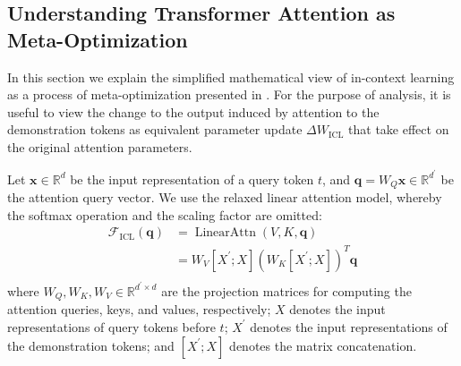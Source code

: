 \subsection{Understanding Transformer Attention as Meta-Optimization}
\label{sec:icl_dual}
In this section we explain the simplified mathematical view of in-context learning as a process of meta-optimization presented in \cite{dai2023gpt}.
For the purpose of analysis, it is useful to view the change to the output induced by attention to the demonstration tokens as equivalent parameter update $\Delta W_{\text{ICL}}$ that take effect on the original attention parameters.

Let $\mathbf{x} \in \mathbb{R}^{d}$ be the input representation of a query token $t$, and $\mathbf{q} = W_{Q} \mathbf{x} \in \mathbb{R}^{d^{\prime}}$ be the attention query vector. 
We use the relaxed linear attention model, whereby the softmax operation and the scaling factor are omitted:
\begin{equation}
    \begin{aligned}
    \mathcal{F}_{\text{ICL}}(\mathbf{q}) & = \operatorname{LinearAttn}(V, K, \mathbf{q}) \\
    & = W_{V} [X^{\prime}; X] \left( W_{K} [X^{\prime}; X] \right)^T \mathbf{q} \\
    \end{aligned}
    \label{equ:icl_attn}
\end{equation}
where $W_{Q}, W_{K}, W_{V} \in \mathbb{R}^{d^{\prime} \times d}$ are the projection matrices for computing the attention queries, keys, and values, respectively; 
$X$ denotes the input representations of query tokens before $t$; 
$X^{\prime}$ denotes the input representations of the demonstration tokens; 
and $[X^{\prime}; X]$ denotes the matrix concatenation. 


